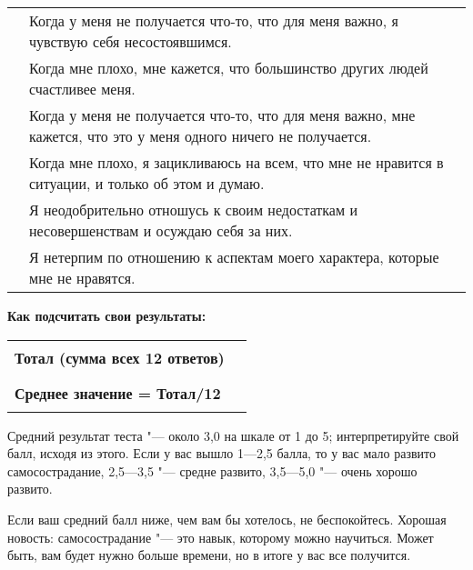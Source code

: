 \begin{center}
	\setlength{\extrarowheight}{2mm}
	\begin{tabularx}{\textwidth}{p{1.7cm}X}
		\noindent\rule{1.7cm}{0.4pt} & Когда у меня не получается что-то, что для меня важно, я чувствую себя несостоявшимся. \\
		\noindent\rule{1.7cm}{0.4pt} & Когда мне плохо, мне кажется, что большинство других людей счастливее меня. \\
		\noindent\rule{1.7cm}{0.4pt} & Когда у меня не получается что-то, что для меня важно, мне кажется, что это у меня одного ничего не получается. \\
		\noindent\rule{1.7cm}{0.4pt} & Когда мне плохо, я зацикливаюсь на всем, что мне не нравится в ситуации, и только об этом и думаю. \\
		\noindent\rule{1.7cm}{0.4pt} & Я неодобрительно отношусь к своим недостаткам и несовершенствам и осуждаю себя за них. \\
		\noindent\rule{1.7cm}{0.4pt} & Я нетерпим по отношению к аспектам моего характера, которые мне не нравятся. \\
	\end{tabularx}
	\setlength{\extrarowheight}{0mm}	
\end{center}

\vspace{3ex}

\noindent\textbf{Как подсчитать свои результаты:}

\begin{flushright}
	\setlength{\extrarowheight}{5mm}
	\begin{tabularx}{11.5cm}{ll}
		\textbf{Тотал (сумма всех 12 ответов)} & \rule{1.7cm}{0.4pt} \\
		\textbf{Среднее значение = Тотал/12} & \rule{1.7cm}{0.4pt}
	\end{tabularx}
	\setlength{\extrarowheight}{0mm}
\end{flushright}

\vspace{3ex}

Средний результат теста "--- около 3,0 на шкале от 1 до 5; интерпретируйте свой балл, исходя из этого. 
Если у вас вышло 1---2,5 балла, то у вас мало развито самосострадание, 2,5---3,5 "--- средне развито, 3,5---5,0 "--- очень хорошо развито.

\newpage


\vspace{3ex}
Если ваш средний балл ниже, чем вам бы хотелось, не беспокойтесь. Хорошая новость: самосострадание "--- это навык, которому можно научиться. Может быть, вам будет нужно больше времени, но в итоге у вас все получится. 


